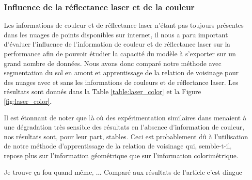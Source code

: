 \documentclass[a4paper, onecolumn, 11pt]{article}
\newcommand{\TODO}{\fbox{\textcolor{red}{TODO}}}
\begin{document}


\subsubsection{Influence de la réflectance laser et de la couleur}

Les informations de couleur et de réflectance laser n'étant pas toujours présentes dans les nuages de points disponibles sur internet, il nous a paru important d'évaluer l'influence de l'information de couleur et de réflectance laser sur la performance afin de pouvoir étudier la capacité du modèle à s'exporter sur un grand nombre de données. Nous avons donc comparé notre méthode avec segmentation du sol en amont et apprentissage de la relation de voisinage pour des nuages avec et sans les informations de couleurs et de réflectance laser. Les résultats sont donnés dans la Table \ref{table:laser_color} et la Figure \ref{fig:laser_color}.

Il est étonnant de noter que là où des expérimentation similaires dans \cite{aka_article} menaient à une dégradation très sensible des résultats en l'absence d'information de couleur, nos résultats sont, pour leur part, stables. Ceci est probablement dû à l'utilisation de notre méthode d'apprentissage de la relation de voisinage qui, semble-t-il, repose plus sur l'information géométrique que sur l'information colorimétrique.

\TODO Je trouve ça fou quand même, ... Comparé aux résultats de l'article c'est dingue
\end{document}
